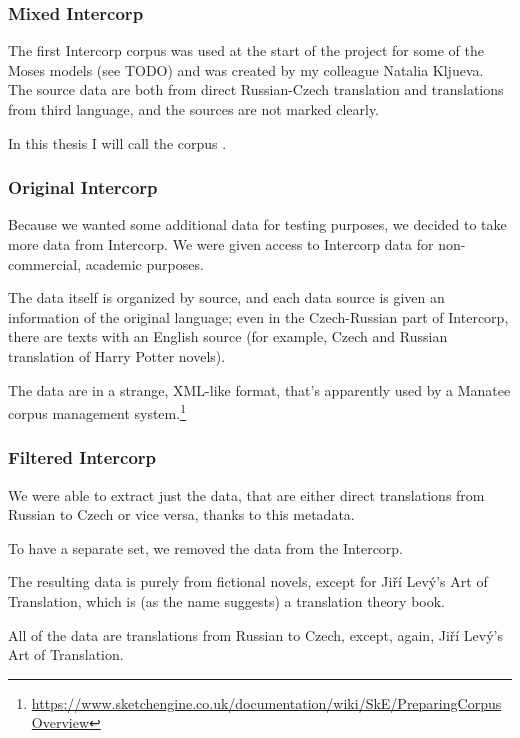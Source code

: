 \subsubsection{Mixed Intercorp}
The first Intercorp corpus was used at the start of the project for some of the Moses models (see TODO) and was created by my colleague Natalia Kljueva. 
The source data are both from direct Russian-Czech translation and translations from third language, and the sources are not marked clearly.

In this thesis I will call the corpus .

\subsubsection{Original Intercorp}

Because we wanted some additional data for testing purposes, we decided to take more data from Intercorp. We were given access to  Intercorp data for non-commercial, academic purposes.

The data itself is organized by source, and each data source is given an information of the original language; even in the Czech-Russian part of Intercorp, there are texts with an English source (for example, Czech and Russian translation of Harry Potter novels). 

The data are in a strange, XML-like format, that's apparently used by a Manatee corpus management system.\footnote{\url{https://www.sketchengine.co.uk/documentation/wiki/SkE/PreparingCorpusOverview}}

\subsubsection{Filtered Intercorp}

We were able to extract just the data, that are either direct translations from Russian to Czech or vice versa, thanks to this metadata.

To have a separate set, we removed the data from the  Intercorp.

The resulting data is purely from fictional novels, except for Jiří Levý's Art of Translation, which is (as the name suggests) a translation theory book.

All of the data are translations from Russian to Czech, except, again, Jiří Levý's Art of Translation.

